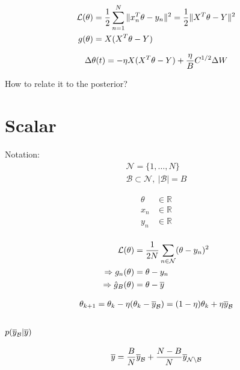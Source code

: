 \begin{align}
  \mathcal{L}(\theta) &= \frac{1}{2} \sum_{n=1}^N  \| x_n^T \theta - y_n \|^2 = \frac{1}{2} \| X^T \theta - Y \|^2 \nonumber \\
  g(\theta) &= X (X^T \theta - Y)
  \label{eq:linear_loss}
\end{align}

\begin{align}
  \Delta \theta(t) = - \eta X (X^T \theta - Y) + \frac{\eta}{B} C^{1/2} \Delta W
  \label{eq:sgd_diff}
\end{align}

How to relate it to the posterior?

\section{Scalar}

Notation:
\begin{align}
  \mathcal{N} = \{1, \dots, N\} \nonumber \\
  \mathcal{B} \subset \mathcal{N},\ |\mathcal{B}| = B
\end{align}

\begin{align}
  \theta &\in \mathbb{R} \nonumber \\
  x_n &\in \mathbb{R} \nonumber \\
  y_n &\in \mathbb{R} \nonumber \\
\end{align}

\begin{align}
  \mathcal{L}(\theta) &= \frac{1}{2N} \sum_{n \in \mathcal{N}} (\theta - y_n)^2 \nonumber \\
  \Rightarrow g_n(\theta) &= \theta - y_n \nonumber \\
  \Rightarrow \hat{g}_B(\theta) &= \theta - \overline{y} \nonumber \\
  \label{eq:linear_loss}
\end{align}

\begin{align}
  \theta_{k+1} = \theta_k - \eta (\theta_k - \overline{y}_{\mathcal{B}}) = (1- \eta) \theta_k + \eta \overline{y}_{\mathcal{B}}
  \label{eq:sgd_step_scalar}
\end{align}

\subsection{$p(\overline{y}_{\mathcal{B}} | \overline{y} )$}

\begin{equation}
  \overline{y} = \frac{B}{N} \overline{y}_{\mathcal{B}} + \frac{N-B}{N} \overline{y}_{\mathcal{N} \setminus \mathcal{B}}
\end{equation}

